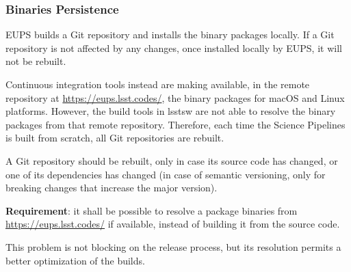 \subsubsection{Binaries Persistence} \label{sec:problemPersistence}

EUPS builds a Git repository and installs the binary packages locally. 
If a Git repository is not affected by any changes, once installed locally by EUPS, it will not be rebuilt.

Continuous integration tools instead are making available, in the remote repository at \url{https://eups.lsst.codes/}, the binary packages for macOS and Linux platforms.
However, the build tools in lsstsw are not able to resolve the binary packages from that remote repository.
Therefore, each time the Science Pipelines is built from scratch, all Git repositories are rebuilt.

A Git repository should be rebuilt, only in case its source code has changed, or one of its dependencies has changed (in case of semantic versioning, only for breaking changes that increase the major version).

\textbf{Requirement}: it shall be possible to resolve a package binaries from \url{https://eups.lsst.codes/} if available, instead of building it from the source code.

This problem is not blocking on the release process, but its resolution permits a better optimization of the builds.


